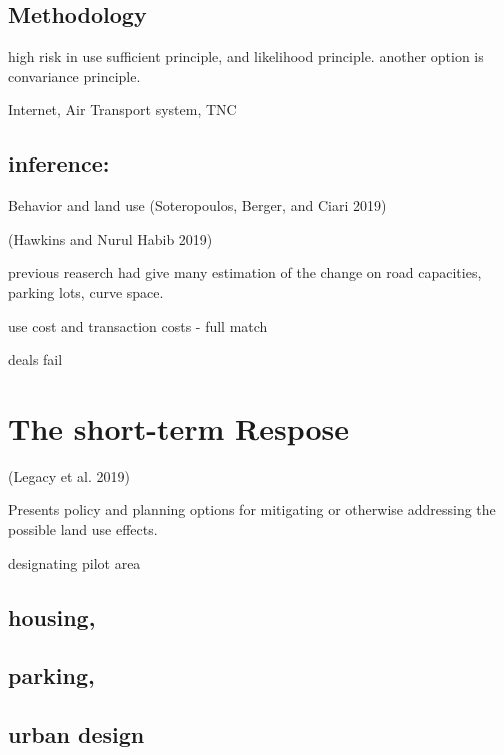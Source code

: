 \documentclass[12pt,]{article}
\begin{document}
\hypertarget{methodology}{%
\subsection{Methodology}\label{methodology}}

high risk in use sufficient principle, and likelihood principle. another
option is convariance principle.

Internet, Air Transport system, TNC

\hypertarget{inference}{%
\subsection{inference:}\label{inference}}

Behavior and land use (Soteropoulos, Berger, and Ciari 2019)

(Hawkins and Nurul Habib 2019)

previous reaserch had give many estimation of the change on road
capacities, parking lots, curve space.

use cost and transaction costs - full match

deals fail

\hypertarget{the-short-term-respose}{%
\section{The short-term Respose}\label{the-short-term-respose}}

(Legacy et al. 2019)

Presents policy and planning options for mitigating or otherwise
addressing the possible land use effects.

designating pilot area

\hypertarget{housing}{%
\subsection{housing,}\label{housing}}

\hypertarget{parking}{%
\subsection{parking,}\label{parking}}

\hypertarget{urban-design}{%
\subsection{urban design}\label{urban-design}}
\end{document}

